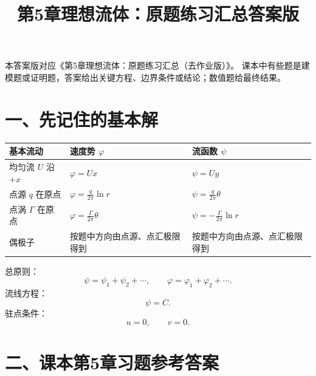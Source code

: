 \documentclass[UTF8,zihao=-4]{ctexart}
\title{\bfseries 第5章理想流体：原题练习汇总答案版}
\author{}
\date{}
\begin{document}
\maketitle

本答案版对应《第5章理想流体：原题练习汇总（去作业版）》。
课本中有些题是建模题或证明题，答案给出关键方程、边界条件或结论；数值题给最终结果。

\section*{一、先记住的基本解}

\begin{longtable}{p{3cm}p{5.1cm}p{5.8cm}}
\toprule
\textbf{基本流动} & \textbf{速度势 $\varphi$} & \textbf{流函数 $\psi$}\\
\midrule
均匀流 $U$ 沿 $+x$ & $\varphi=Ux$ & $\psi=Uy$\\
点源 $q$ 在原点 & $\displaystyle \varphi=\frac{q}{2\pi}\ln r$ & $\displaystyle \psi=\frac{q}{2\pi}\theta$\\
点涡 $\Gamma$ 在原点 & $\displaystyle \varphi=\frac{\Gamma}{2\pi}\theta$ & $\displaystyle \psi=-\frac{\Gamma}{2\pi}\ln r$\\
偶极子 & 按题中方向由点源、点汇极限得到 & 按题中方向由点源、点汇极限得到\\
\bottomrule
\end{longtable}

总原则：
\[
\psi=\psi_1+\psi_2+\cdots,\qquad
\varphi=\varphi_1+\varphi_2+\cdots .
\]
流线方程：
\[
\psi=C.
\]
驻点条件：
\[
u=0,\qquad v=0.
\]

\section*{二、课本第5章习题参考答案}
\end{document}
